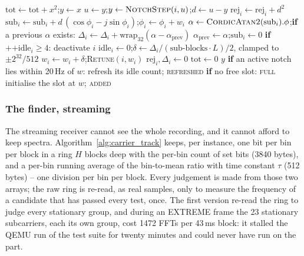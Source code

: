 \begin{algorithm}[htbp]
\caption{Notch bank: one sample, and the tick (\texttt{dsp.c}).}
\label{alg:notch_bank}
\begin{algorithmic}[1]
 
    \State $\mathrm{tot} \gets \mathrm{tot} + x^2$;\quad $y \gets x$
        \State $u \gets y$;\quad $y \gets \textsc{NotchStep}(i, u)$;\quad $d \gets u - y$ 
        \State $\mathrm{rej}_i \gets \mathrm{rej}_i + d^2$
        \State $\mathrm{sub}_i \gets \mathrm{sub}_i + d\,(\cos\phi_i - j \sin\phi_i)$;\quad $\phi_i \gets \phi_i + w_i$ 
            \State $\alpha \gets \textsc{CordicAtan2}(\mathrm{sub}_i).\phi$;\quad \textbf{if} a previous $\alpha$ exists: $\Delta_i \gets \Delta_i + \mathrm{wrap}_{32}(\alpha - \alpha_{\mathrm{prev}})$
            \State $\alpha_{\mathrm{prev}} \gets \alpha$;\quad $\mathrm{sub}_i \gets 0$
        \EndIf
    \EndFor
     
                \State \textbf{if} $\text{++idle}_i \ge 4$: deactivate $i$ 
            \Else
                \State $\mathrm{idle}_i \gets 0$;\quad $\delta \gets \Delta_i / (\text{sub-blocks} \cdot L) / 2$, clamped to $\pm 2^{32}/512$
                \State $w_i \gets w_i + \delta$;\quad \textsc{Retune}$(i, w_i)$ 
            \EndIf
            \State $\mathrm{rej}_i, \Delta_i \gets 0$
        \EndFor
        \State $\mathrm{tot} \gets 0$
    \EndIf
    \State \Return $y$
\EndFunction
{} 
    \State \textbf{if} an active notch lies within 20\,Hz of $w$: refresh its idle count; \Return \textsc{refreshed}
    \State \textbf{if} no free slot: \Return \textsc{full}
    \State initialise the slot at $w$; \Return \textsc{added}
\EndFunction
\end{algorithmic}
\end{algorithm}

\subsubsection*{The finder, streaming}

The streaming receiver cannot see the whole recording, and it cannot
afford to keep spectra.  Algorithm~\ref{alg:carrier_track} keeps, per
instance, one bit per bin per block in a ring $H$ blocks deep with the
per-bin count of set bits (3840 bytes), and a per-bin running average
of the bin-to-mean ratio with time constant $\tau$ (512 bytes) -- one
division per bin per block.  Every judgement is made from those two
arrays; the raw ring is re-read, as real samples, only to measure the
frequency of a candidate that has passed every test, once.  The first
version re-read the ring to judge every stationary group, and during
an EXTREME frame the 23 stationary subcarriers, each its own group,
cost 1472 FFTs per 43\,ms block: it stalled the QEMU run of the test
suite for twenty minutes and could never have run on the part.


